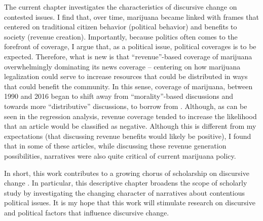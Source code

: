 The current chapter investigates the characteristics of discursive change on contested issues. I find that, over time, marijuana became linked with frames that centered on traditional citizen behavior (political behavior) and benefits to society (revenue creation). Importantly, because politics often comes to the forefront of coverage, I argue that, as a political issue, political coverages is to be expected. Therefore, what is new is that ``revenue''-based coverage of marijuana overwhelmingly dominating its news coverage -- centering on how marijuana legalization could serve to increase resources that could be distributed in ways that could benefit the community. In this sense, coverage of marijuana, between 1990 and 2016 began to shift away from ``morality''-based discussions and towards more ``distributive'' discussions, to borrow from \citet{lowi_1964}. Although, as can be seen in the regression analysis, revenue coverage tended to increase the likelihood that an article would be classified as negative. Although this is different from my expectations (that discussing revenue benefits would likely be positive), I found that in some of these articles, while discussing these revenue generation possibilities, narratives were also quite critical of current marijuana policy. 

In short, this work contributes to a growing chorus of scholarship on discursive change \citep{bail_2012,bateman_et_al_2019}. In particular, this descriptive chapter broadens the scope of scholarly study by investigating the changing character of narratives about contentious political issues. It is my hope that this work will stimulate research on discursive and political factors that influence discursive change.




%
%




